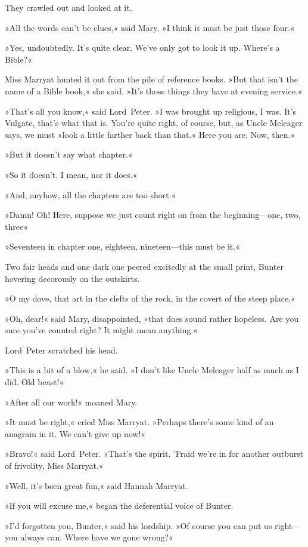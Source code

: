 They crawled out and looked at it.

»All the words can't be clues,« said Mary. »I think it must be just those four.«

»Yes, undoubtedly. It's quite clear. We've only got to look it up. Where's a Bible?«

Miss Marryat hunted it out from the pile of reference books. »But that isn't the name of a Bible book,« she said. »It's those things they have at evening service.«

»That's all you know,« said Lord~Peter. »I was brought up religious, I was. It's Vulgate, that's what that is. You're quite right, of course, but, as Uncle Meleager says, we must »look a little farther back than that.« Here you are. Now, then.«

»But it doesn't say what chapter.«

»So it doesn't. I mean, nor it does.«

»And, anyhow, all the chapters are too short.«

»Damn! Oh! Here, suppose we just count right on from the beginning—one, two, three\longdash«

»Seventeen in chapter one, eighteen, nineteen—this must be it.«

Two fair heads and one dark one peered excitedly at the small print, Bunter hovering decorously on the outskirts.

»O my dove, that art in the clefts of the rock, in the covert of the steep place.«

»Oh, dear!« said Mary, disappointed, »that does sound rather hopeless. Are you sure you've counted right? It might mean anything.«

Lord~Peter scratched his head.

»This is a bit of a blow,« he said. »I don't like Uncle Meleager half as much as I did. Old beast!«

»After all our work!« moaned Mary.

»It must be right,« cried Miss Marryat. »Perhaps there's some kind of an anagram in it. We can't give up now!«

»Bravo!« said Lord~Peter. »That's the spirit. 'Fraid we're in for another outburst of frivolity, Miss Marryat.«

»Well, it's been great fun,« said Hannah Marryat.

»If you will excuse me,« began the deferential voice of Bunter.

»I'd forgotten you, Bunter,« said his lordship. »Of course you can put us right—you always can. Where have we gone wrong?«

